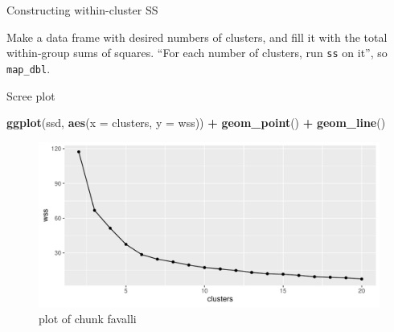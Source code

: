 \documentclass[ignorenonframetext,]{beamer}
\newenvironment{Shaded}{\begin{snugshade}}{\end{snugshade}}
\newcommand{\DataTypeTok}[1]{\textcolor[rgb]{0.13,0.29,0.53}{#1}}
\newcommand{\DecValTok}[1]{\textcolor[rgb]{0.00,0.00,0.81}{#1}}
\newcommand{\KeywordTok}[1]{\textcolor[rgb]{0.13,0.29,0.53}{\textbf{#1}}}
\newcommand{\NormalTok}[1]{#1}
\newcommand{\OperatorTok}[1]{\textcolor[rgb]{0.81,0.36,0.00}{\textbf{#1}}}
\newcommand{\StringTok}[1]{\textcolor[rgb]{0.31,0.60,0.02}{#1}}
\begin{document}
\begin{frame}[fragile]{Constructing within-cluster SS}
\protect\hypertarget{constructing-within-cluster-ss}{}

Make a data frame with desired numbers of clusters, and fill it with the
total within-group sums of squares. ``For each number of clusters, run
\texttt{ss} on it'', so \texttt{map\_dbl}.

\normalsize

\begin{Shaded}
\end{Shaded}

\normalsize

\end{frame}

\begin{frame}[fragile]{Scree plot}
\protect\hypertarget{scree-plot}{}

\begin{Shaded}
\begin{Highlighting}[]
\KeywordTok{ggplot}\NormalTok{(ssd, }\KeywordTok{aes}\NormalTok{(}\DataTypeTok{x =}\NormalTok{ clusters, }\DataTypeTok{y =}\NormalTok{ wss)) }\OperatorTok{+}\StringTok{ }\KeywordTok{geom_point}\NormalTok{() }\OperatorTok{+}
\StringTok{  }\KeywordTok{geom_line}\NormalTok{()}
\end{Highlighting}
\end{Shaded}

\begin{figure}
\centering
\includegraphics{figure/favalli-1.pdf}
\caption{plot of chunk favalli}
\end{figure}

\end{frame}
\end{document}
